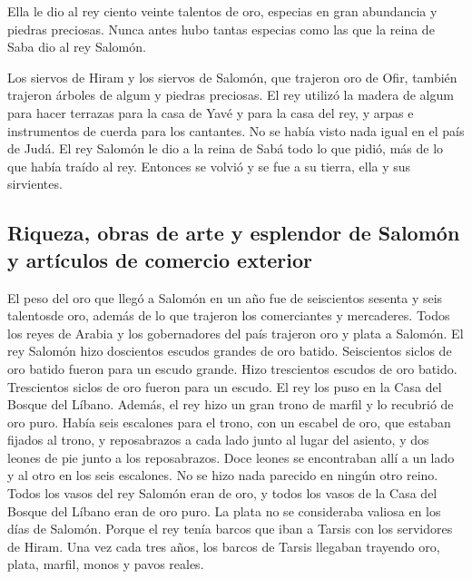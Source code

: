  Ella le dio al rey ciento veinte talentos de oro,
especias en gran abundancia y piedras preciosas. Nunca antes hubo tantas
especias como las que la reina de Saba dio al rey Salomón.

 Los siervos de Hiram y los siervos de Salomón, que
trajeron oro de Ofir, también trajeron árboles de algum y piedras
preciosas.  El rey utilizó la madera de algum para hacer
terrazas para la casa de Yavé y para la casa del rey, y arpas e
instrumentos de cuerda para los cantantes. No se había visto nada igual
en el país de Judá.  El rey Salomón le dio a la reina de
Sabá todo lo que pidió, más de lo que había traído al rey. Entonces se
volvió y se fue a su tierra, ella y sus sirvientes.

\hypertarget{riqueza-obras-de-arte-y-esplendor-de-salomuxf3n-y-artuxedculos-de-comercio-exterior}{%
\subsection{Riqueza, obras de arte y esplendor de Salomón y artículos de
comercio
exterior}\label{riqueza-obras-de-arte-y-esplendor-de-salomuxf3n-y-artuxedculos-de-comercio-exterior}}

 El peso del oro que llegó a Salomón en un año fue de
seiscientos sesenta y seis talentosde oro,  además de lo
que trajeron los comerciantes y mercaderes. Todos los reyes de Arabia y
los gobernadores del país trajeron oro y plata a Salomón.
 El rey Salomón hizo doscientos escudos grandes de oro
batido. Seiscientos siclos de oro batido fueron para un escudo grande.
 Hizo trescientos escudos de oro batido. Trescientos
siclos de oro fueron para un escudo. El rey los puso en la Casa del
Bosque del Líbano.  Además, el rey hizo un gran trono de
marfil y lo recubrió de oro puro.  Había seis escalones
para el trono, con un escabel de oro, que estaban fijados al trono, y
reposabrazos a cada lado junto al lugar del asiento, y dos leones de pie
junto a los reposabrazos.  Doce leones se encontraban
allí a un lado y al otro en los seis escalones. No se hizo nada parecido
en ningún otro reino.  Todos los vasos del rey Salomón
eran de oro, y todos los vasos de la Casa del Bosque del Líbano eran de
oro puro. La plata no se consideraba valiosa en los días de Salomón.
 Porque el rey tenía barcos que iban a Tarsis con los
servidores de Hiram. Una vez cada tres años, los barcos de Tarsis
llegaban trayendo oro, plata, marfil, monos y pavos reales.

